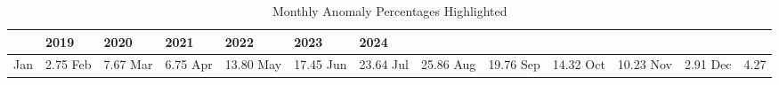 \begin{table}
\caption{Monthly Anomaly Percentages Highlighted}
\label{tab:anomaly_percentages}
\begin{tabular}{lllllll}
\toprule
 & 2019 & 2020 & 2021 & 2022 & 2023 & 2024 \\
\midrule
Jan & 2.75%
Feb & 7.67%
Mar & 6.75%
Apr & 13.80%
May & 17.45%
Jun & 23.64%
Jul & 25.86%
Aug & 19.76%
Sep & 14.32%
Oct & 10.23%
Nov & 2.91%
Dec & 4.27%
\bottomrule
\end{tabular}
\end{table}
